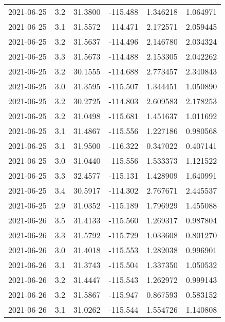\begin{tabular}{lrrrrr}
2021-06-25 &       3.2 &  31.3800 &  -115.488 &         1.346218 &         1.064971 \\
2021-06-25 &       3.1 &  31.5572 &  -114.471 &         2.172571 &         2.059445 \\
2021-06-25 &       3.2 &  31.5637 &  -114.496 &         2.146780 &         2.034324 \\
2021-06-25 &       3.3 &  31.5673 &  -114.488 &         2.153305 &         2.042262 \\
2021-06-25 &       3.2 &  30.1555 &  -114.688 &         2.773457 &         2.340843 \\
2021-06-25 &       3.0 &  31.3595 &  -115.507 &         1.344451 &         1.050890 \\
2021-06-25 &       3.2 &  30.2725 &  -114.803 &         2.609583 &         2.178253 \\
2021-06-25 &       3.2 &  31.0498 &  -115.681 &         1.451637 &         1.011692 \\
2021-06-25 &       3.1 &  31.4867 &  -115.556 &         1.227186 &         0.980568 \\
2021-06-25 &       3.1 &  31.9500 &  -116.322 &         0.347022 &         0.407141 \\
2021-06-25 &       3.0 &  31.0440 &  -115.556 &         1.533373 &         1.121522 \\
2021-06-25 &       3.3 &  32.4577 &  -115.131 &         1.428909 &         1.640991 \\
2021-06-25 &       3.4 &  30.5917 &  -114.302 &         2.767671 &         2.445537 \\
2021-06-25 &       2.9 &  31.0352 &  -115.189 &         1.796929 &         1.455088 \\
2021-06-26 &       3.5 &  31.4133 &  -115.560 &         1.269317 &         0.987804 \\
2021-06-26 &       3.3 &  31.5792 &  -115.729 &         1.033608 &         0.801270 \\
2021-06-26 &       3.0 &  31.4018 &  -115.553 &         1.282038 &         0.996901 \\
2021-06-26 &       3.1 &  31.3743 &  -115.504 &         1.337350 &         1.050532 \\
2021-06-26 &       3.2 &  31.4447 &  -115.543 &         1.262972 &         0.999143 \\
2021-06-26 &       3.2 &  31.5867 &  -115.947 &         0.867593 &         0.583152 \\
2021-06-26 &       3.1 &  31.0262 &  -115.544 &         1.554726 &         1.140808 \\

\end{tabular}

